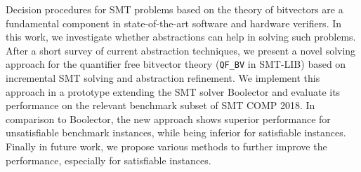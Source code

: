 
\Abstract
Decision procedures for SMT problems based on the theory of bitvectors are a fundamental component in state-of-the-art software and hardware verifiers.
In this work, we investigate whether abstractions can help in solving such problems.
After a short survey of current abstraction techniques, we present a novel solving approach for the quantifier free bitvector theory (\texttt{QF\_BV} in SMT-LIB) based on incremental SMT solving and abstraction refinement.
We implement this approach in a prototype extending the SMT solver Boolector and evaluate its performance on the relevant benchmark subset of SMT COMP 2018.
In comparison to Boolector, the new approach shows superior performance for unsatisfiable benchmark instances, while being inferior for satisfiable instances.
Finally in future work, we propose various methods to further improve the performance, especially for satisfiable instances.